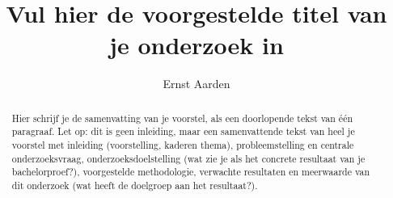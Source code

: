\documentclass{hogent-article}
\title{Vul hier de voorgestelde titel van je onderzoek in}
\author{Ernst Aarden}
\begin{document}
\begin{abstract}
  Hier schrijf je de samenvatting van je voorstel, als een doorlopende tekst van één paragraaf. Let op: dit is geen inleiding, maar een samenvattende tekst van heel je voorstel met inleiding (voorstelling, kaderen thema), probleemstelling en centrale onderzoeksvraag, onderzoeksdoelstelling (wat zie je als het concrete resultaat van je bachelorproef?), voorgestelde methodologie, verwachte resultaten en meerwaarde van dit onderzoek (wat heeft de doelgroep aan het resultaat?).
\end{abstract}

\tableofcontents



\printbibliography[heading=bibintoc]
\end{document}
